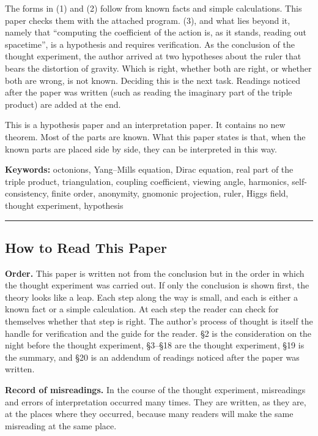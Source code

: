 \documentclass[
  a4paper,
]{article}
\begin{document}
The forms in (1) and (2) follow from known facts and simple
calculations. This paper checks them with the attached program. (3), and
what lies beyond it, namely that ``computing the coefficient of the
action is, as it stands, reading out spacetime'', is a hypothesis and
requires verification. As the conclusion of the thought experiment, the
author arrived at two hypotheses about the ruler that bears the
distortion of gravity. Which is right, whether both are right, or
whether both are wrong, is not known. Deciding this is the next task.
Readings noticed after the paper was written (such as reading the
imaginary part of the triple product) are added at the end.

This is a hypothesis paper and an interpretation paper. It contains no
new theorem. Most of the parts are known. What this paper states is
that, when the known parts are placed side by side, they can be
interpreted in this way.

\textbf{Keywords:} octonions, Yang--Mills equation, Dirac equation, real
part of the triple product, triangulation, coupling coefficient, viewing
angle, harmonics, self-consistency, finite order, anonymity, gnomonic
projection, ruler, Higgs field, thought experiment, hypothesis

\begin{center}\rule{0.5\linewidth}{0.5pt}\end{center}

\subsection{How to Read This Paper}\label{how-to-read-this-paper}

\textbf{Order.} This paper is written not from the conclusion but in the
order in which the thought experiment was carried out. If only the
conclusion is shown first, the theory looks like a leap. Each step along
the way is small, and each is either a known fact or a simple
calculation. At each step the reader can check for themselves whether
that step is right. The author's process of thought is itself the handle
for verification and the guide for the reader. §2 is the consideration
on the night before the thought experiment, §3--§18 are the thought
experiment, §19 is the summary, and §20 is an addendum of readings
noticed after the paper was written.

\textbf{Record of misreadings.} In the course of the thought experiment,
misreadings and errors of interpretation occurred many times. They are
written, as they are, at the places where they occurred, because many
readers will make the same misreading at the same place.
\end{document}
